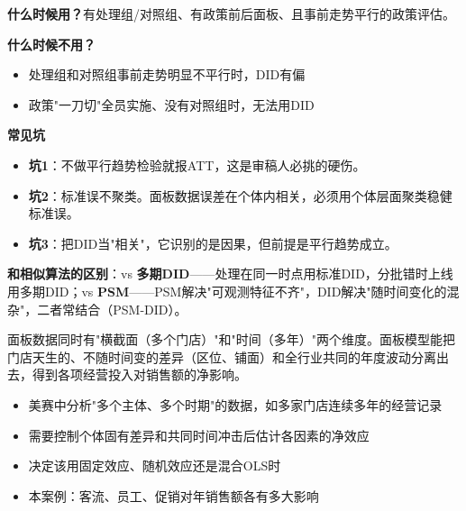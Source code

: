 \begin{algonotes}
\textbf{什么时候用？}有处理组/对照组、有政策前后面板、且事前走势平行的政策评估。

\textbf{什么时候不用？}
\begin{itemize}
    \item 处理组和对照组事前走势明显不平行时，DID有偏
    \item 政策"一刀切"全员实施、没有对照组时，无法用DID
\end{itemize}

\textbf{常见坑}
\begin{itemize}
    \item \textbf{坑1}：不做平行趋势检验就报ATT，这是审稿人必挑的硬伤。
    \item \textbf{坑2}：标准误不聚类。面板数据误差在个体内相关，必须用个体层面聚类稳健标准误。
    \item \textbf{坑3}：把DID当"相关"，它识别的是因果，但前提是平行趋势成立。
\end{itemize}

\textbf{和相似算法的区别}：vs \textbf{多期DID}——处理在同一时点用标准DID，分批错时上线用多期DID；vs \textbf{PSM}——PSM解决"可观测特征不齐"，DID解决"随时间变化的混杂"，二者常结合（PSM-DID）。
\end{algonotes}


\begin{algointro}
面板数据同时有"横截面（多个门店）"和"时间（多年）"两个维度。面板模型能把门店天生的、不随时间变的差异（区位、铺面）和全行业共同的年度波动分离出去，得到各项经营投入对销售额的净影响。
\end{algointro}

\begin{algoscene}
\begin{itemize}
    \item 美赛中分析"多个主体、多个时期"的数据，如多家门店连续多年的经营记录
    \item 需要控制个体固有差异和共同时间冲击后估计各因素的净效应
    \item 决定该用固定效应、随机效应还是混合OLS时
    \item 本案例：客流、员工、促销对年销售额各有多大影响
\end{itemize}
\end{algoscene}

